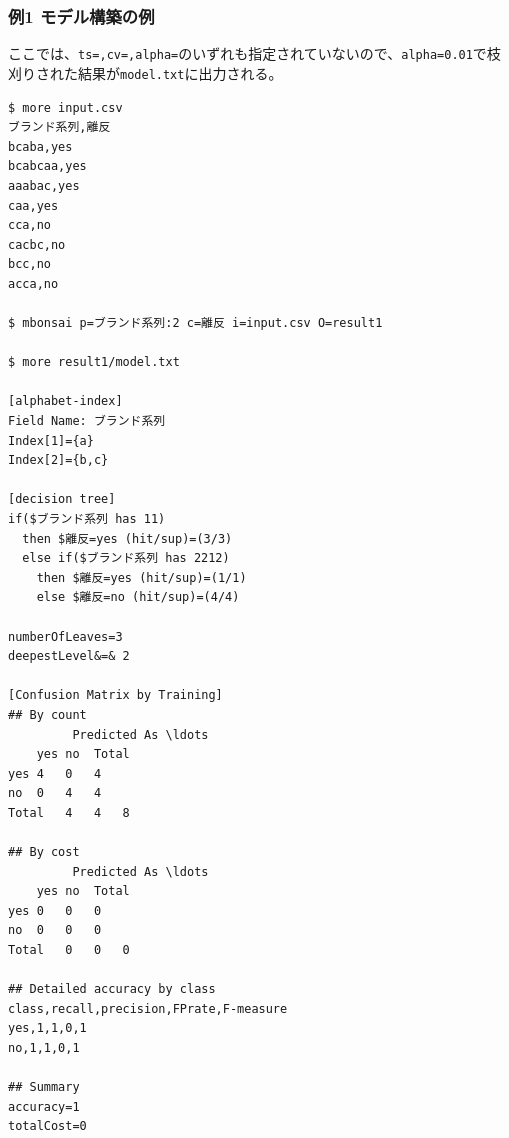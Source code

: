 \subsubsection{例1 モデル構築の例}
ここでは、\verb|ts=,cv=,alpha=|のいずれも指定されていないので、\verb|alpha=0.01|で枝刈りされた結果が\verb|model.txt|に出力される。
\begin{Verbatim}[baselinestretch=0.7,frame=single]
$ more input.csv
ブランド系列,離反
bcaba,yes
bcabcaa,yes
aaabac,yes
caa,yes
cca,no
cacbc,no
bcc,no
acca,no

$ mbonsai p=ブランド系列:2 c=離反 i=input.csv O=result1

$ more result1/model.txt

[alphabet-index]
Field Name: ブランド系列
Index[1]={a}
Index[2]={b,c}

[decision tree]
if($ブランド系列 has 11)
  then $離反=yes (hit/sup)=(3/3)
  else if($ブランド系列 has 2212)
    then $離反=yes (hit/sup)=(1/1)
    else $離反=no (hit/sup)=(4/4)

numberOfLeaves=3
deepestLevel&=& 2

[Confusion Matrix by Training]
## By count
         Predicted As \ldots
	yes	no	Total
yes	4	0	4
no	0	4	4
Total	4	4	8

## By cost
         Predicted As \ldots
	yes	no	Total
yes	0	0	0
no	0	0	0
Total	0	0	0

## Detailed accuracy by class
class,recall,precision,FPrate,F-measure
yes,1,1,0,1
no,1,1,0,1

## Summary
accuracy=1
totalCost=0


\end{Verbatim}
